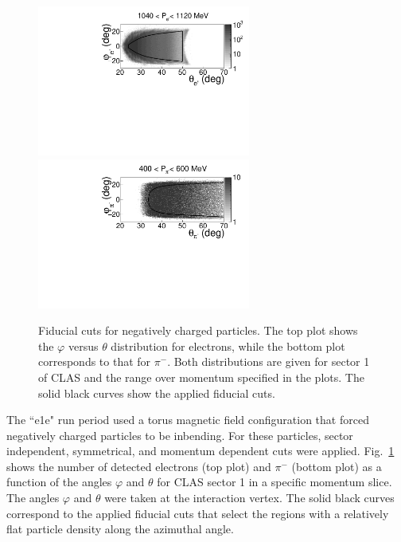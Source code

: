 \documentclass[prc,twocolumn,superscriptaddress,showpacs,amssymb,amsmath,amsfonts,aps,nofootinbib]{revtex4-1}
\begin{document}
\begin{figure}[htp]
\begin{center}
\includegraphics[width=7cm,keepaspectratio]{pictures/fiducial_cuts/electrons.pdf}
\includegraphics[width=7cm,keepaspectratio]{pictures/fiducial_cuts/pim.pdf} 
\vspace{-0.1cm}
\caption{Fiducial cuts for negatively charged particles. The top plot shows the $\varphi$ versus $\theta$ distribution for electrons, while the bottom plot corresponds to that for $\pi^{-}$. Both distributions are given for sector 1 of CLAS and the range over momentum specified in the plots.  The solid black curves show the applied fiducial cuts. }
\label{fig:fid_cuts_neg}
\end{center}
\end{figure} 

The ``e1e" run period used a torus magnetic field configuration that forced negatively charged particles to be inbending. For these particles, sector independent, symmetrical, and momentum dependent cuts were applied. 
Fig.~\ref{fig:fid_cuts_neg} shows the number of detected electrons (top plot) and $\pi^{-}$ (bottom plot) as a function of the angles $\varphi$ and $\theta$  for CLAS sector 1 in a specific momentum slice. The angles $\varphi$ and $\theta$ were taken at the interaction vertex. The solid black curves correspond to the applied fiducial cuts that select the regions with a relatively flat particle density along the azimuthal angle. 
\end{document}
